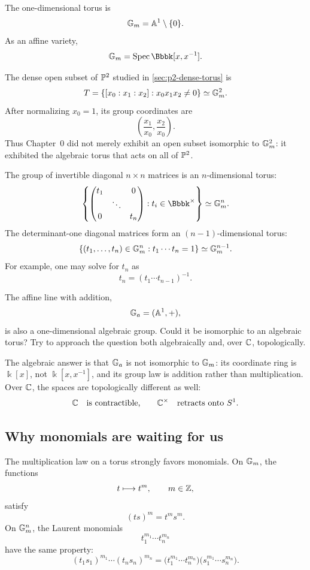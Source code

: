 \begin{example}
The one-dimensional torus is
\[
\mathbb{G}_{m}=\mathbb{A}^1\setminus\{0\}.
\]
As an affine variety,
\[
\Gm=\Spec\Bbbk[x,x^{-1}].
\]
\end{example}

\begin{example}
The dense open subset of \(\mathbb{P}^2\) studied in
\cref{sec:p2-dense-torus} is
\[
T
=
\{[x_0:x_1:x_2]:x_0x_1x_2\neq0\}
\simeq\mathbb{G}_{m}^2.
\]
After normalizing \(x_0=1\), its group coordinates are
\[
\left(\frac{x_1}{x_0},\frac{x_2}{x_0}\right).
\]
Thus Chapter~0 did not merely exhibit an open subset isomorphic to
\(\mathbb{G}_{m}^2\): it exhibited the algebraic torus that acts on all of
\(\mathbb{P}^2\).
\end{example}

\begin{example}
The group of invertible diagonal \(n\times n\) matrices is an
\(n\)-dimensional torus:
\[
\left\{
\begin{pmatrix}
t_1&&0\\
&\ddots&\\
0&&t_n
\end{pmatrix}
:
t_i\in\Bbbk^\times
\right\}
\simeq
\Gm^n.
\]
The determinant-one diagonal matrices form an
\((n-1)\)-dimensional torus:
\[
\{(t_1,\ldots,t_n)\in\mathbb{G}_{m}^n:t_1\cdots t_n=1\}
\simeq
\mathbb{G}_{m}^{n-1}.
\]
For example, one may solve for \(t_n\) as
\[
t_n=(t_1\cdots t_{n-1})^{-1}.
\]
\end{example}

\begin{pauseandthink}
The affine line with addition,
\[
\mathbb{G}_{a}=(\mathbb{A}^1,+),
\]
is also a one-dimensional algebraic group. Could it be isomorphic to
an algebraic torus? Try to approach the question both algebraically
and, over \(\mathbb{C}\), topologically.
\end{pauseandthink}

The algebraic answer is that \(\mathbb{G}_{a}\) is not isomorphic to \(\mathbb{G}_{m}\):
its coordinate ring is \(\Bbbk[x]\), not
\(\Bbbk[x,x^{-1}]\), and its group law is addition rather than
multiplication. Over \(\mathbb{C}\), the spaces are topologically different
as well:
\[
\mathbb{C}\quad\text{is contractible,}
\qquad
\mathbb{C}^\times\quad\text{retracts onto }S^1.
\]

\subsection{Why monomials are waiting for us}

The multiplication law on a torus strongly favors monomials. On
\(\mathbb{G}_{m}\), the functions
\[
t\longmapsto t^m,
\qquad
m\in\mathbb{Z},
\]
satisfy
\[
(ts)^m=t^ms^m.
\]
On \(\mathbb{G}_{m}^n\), the Laurent monomials
\[
t_1^{m_1}\cdots t_n^{m_n}
\]
have the same property:
\[
(t_1s_1)^{m_1}\cdots(t_ns_n)^{m_n}
=
\bigl(t_1^{m_1}\cdots t_n^{m_n}\bigr)
\bigl(s_1^{m_1}\cdots s_n^{m_n}\bigr).
\]


